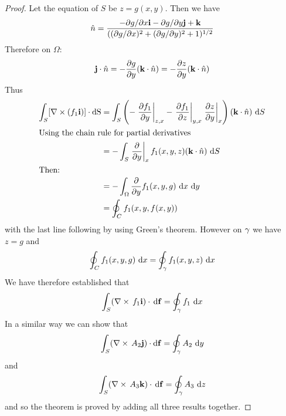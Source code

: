 \begin{proof}
Let the equation of $S$ be $z =g(x,y)$. Then we have
\[
  \hat  n =  \frac{-\partial g/\partial x \mathbf{ i} - \partial g / \partial y \mathbf{ j} + \mathbf{ k}}{((\partial g/\partial x)^2 + (\partial g/\partial y)^2 + 1)^{1/2}}
\]
Therefore on $\Omega$:
\[
  \mathbf{ j} \cdot \hat  n 
  = - \frac{\partial g}{\partial y}(\mathbf{ k} \cdot \hat  n)
  = -\frac{\partial z}{\partial y}(\mathbf{ k} \cdot \hat  n)
\]
Thus
\begin{align*}
  \dint_\superficie [\nabla \times(f_1\vector{i})]\cdot \d \S
  &= 
 \dint_\superficie \left(-\left.\frac{\partial f_1}{\partial y}\right|_{z,x} - \left.\frac{\partial f_1}{\partial z}\right|_{y,x}  \left.\frac{\partial z}{\partial y}\right|_{x}\right)(\vector{k}\cdot \hat  n)\,\d S\\
  \intertext{Using the chain rule for partial derivatives}
  &= -\dint_\superficie \left.\frac{\partial}{\partial y}\right|_{x}
  f_1(x,y,z)(\vector{k}\cdot \hat  n)\,\d S\\
  \intertext{Then:}
  &= -\dint_\Omega\frac{\partial}{\partial y}f_1(x,y,g)\,\d x\,\d y\\
  &= \oint_C f_1(x,y,f(x,y))
\end{align*}
with the last line following by using Green's theorem. However on $\gamma$ we have $z=g$ and 
\[
  \oint_C f_1(x,y,g)\,\d x = \oint_\caminho f_1(x,y,z)\,\d x
\]
We have therefore established that 
\[
 \dint_\superficie(\nabla \times\,f_1\vector{i})\cdot\,\d \vector{f} = 
  \oint_\caminho f_1\,\d x
\]
In a similar way we can show that 
\[
  \dint_\superficie(\nabla \times\,A_2\vector{j}) \cdot \d \vector{f} 
  = \oint_\caminho A_2\,\d y
\]
and 
\[
 \dint_\superficie(\nabla \times\,A_3\vector{k})\cdot \, \d \vector{f} = 
  \oint_\caminho A_3\,\d z
\]
and so the theorem is proved by adding all three results together. \end{proof}




